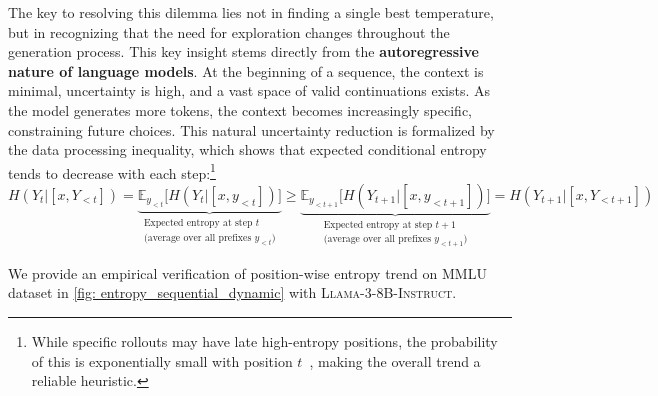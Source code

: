 \documentclass{article} %
\begin{document}
The key to resolving this dilemma lies not in finding a single best temperature, but in recognizing that the need for exploration changes throughout the generation process. 
% 
This key insight stems directly from the \textbf{autoregressive nature of language models}. At the beginning of a sequence, the context is minimal, uncertainty is high, and a vast space of valid continuations exists. As the model generates more tokens, the context becomes increasingly specific, constraining future choices. This natural uncertainty reduction is formalized by the data processing inequality, which shows that expected conditional entropy tends to decrease with each step:\footnote{While specific rollouts may have late high-entropy positions, the probability of this is exponentially small with position $t$~\citep{yang2025alignment}, making the overall trend a reliable heuristic.} 
\begin{equation}
\label{eq:entropy_decay}
H(Y_t | [x, Y_{<t}]) = \underbrace{\mathbb{E}_{y_{<t}}\big[ H(Y_t | [x, y_{<t}]) \big]}_{\substack{\text{Expected entropy at step } t \\ \text{(average over all prefixes } y_{<t}\text{)}}}
\geq 
\underbrace{\mathbb{E}_{y_{<t+1}}\big[ H(Y_{t+1} | [x, y_{<t+1}]) \big]}_{\substack{\text{Expected entropy at step } t+1 \\ \text{(average over all prefixes } y_{<t+1}\text{)}}} = H(Y_{t+1} | [x, Y_{<t+1}])\nonumber
\end{equation}

We provide an empirical verification of position-wise entropy trend on MMLU~\citep{hendrycks2021measuring} dataset in \cref{fig: entropy_sequential_dynamic} with \textsc{Llama-3-8B-Instruct}. 
\end{document}
